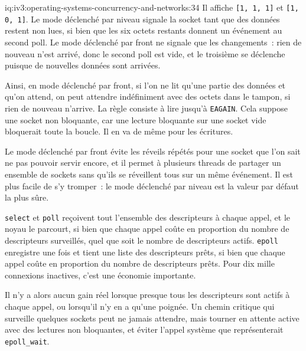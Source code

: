 \begin{solution}{iq:iv3:operating-systems-concurrency-and-networks:34}
Il affiche \texttt{[1, 1, 1]} et \texttt{[1, 0, 1]}. Le mode déclenché par niveau signale la socket tant que des données restent non lues, si bien que les six octets restants donnent un événement au second poll. Le mode déclenché par front ne signale que les changements~: rien de nouveau n'est arrivé, donc le second poll est vide, et le troisième se déclenche puisque de nouvelles données sont arrivées.

Ainsi, en mode déclenché par front, si l'on ne lit qu'une partie des données et qu'on attend, on peut attendre indéfiniment avec des octets dans le tampon, si rien de nouveau n'arrive. La règle consiste à lire jusqu'à \texttt{EAGAIN}. Cela suppose une socket non bloquante, car une lecture bloquante sur une socket vide bloquerait toute la boucle. Il en va de même pour les écritures.

Le mode déclenché par front évite les réveils répétés pour une socket que l'on sait ne pas pouvoir servir encore, et il permet à plusieurs threads de partager un ensemble de sockets sans qu'ils se réveillent tous sur un même événement. Il est plus facile de s'y tromper~: le mode déclenché par niveau est la valeur par défaut la plus sûre.

\texttt{select} et \texttt{poll} reçoivent tout l'ensemble des descripteurs à chaque appel, et le noyau le parcourt, si bien que chaque appel coûte en proportion du nombre de descripteurs surveillés, quel que soit le nombre de descripteurs actifs. \texttt{epoll} enregistre une fois et tient une liste des descripteurs prêts, si bien que chaque appel coûte en proportion du nombre de descripteurs prêts. Pour dix mille connexions inactives, c'est une économie importante.

Il n'y a alors aucun gain réel lorsque presque tous les descripteurs sont actifs à chaque appel, ou lorsqu'il n'y en a qu'une poignée. Un chemin critique qui surveille quelques sockets peut ne jamais attendre, mais tourner en attente active avec des lectures non bloquantes, et éviter l'appel système que représenterait \texttt{epoll\_wait}.

\end{solution}

